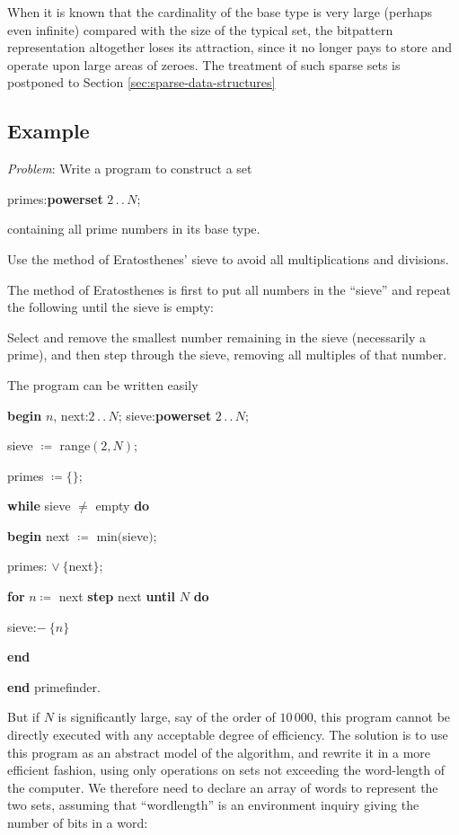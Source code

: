When it is known that the cardinality of the base type is very large (perhaps even infinite) compared with the size of the typical set, the bitpattern representation altogether loses its attraction, since it no longer pays to store and operate upon large areas of zeroes. The treatment of such sparse sets is postponed to Section \ref{sec:sparse-data-structures}

\subsection{Example}

\noindent
\textit{Problem}: Write a program to construct a set

\quad primes:\textbf{powerset} $2\,.\,.\,N$;

\noindent
containing all prime numbers in its base type.

\noindent
Use the method of Eratosthenes' sieve to avoid all multiplications and divisions.

The method of Eratosthenes is first to put all numbers in the ``sieve'' and repeat the following until the sieve is empty:

\noindent
Select and remove the smallest number remaining in the sieve (necessarily a prime), and then step through the sieve, removing all multiples of that number.

The program can be written easily

\noindent
\textbf{begin} $n$, next:$2\,.\,.\,N$; sieve:\textbf{powerset} $2\,.\,.\,N$;

\noindent
\quad sieve $\coloneq$ range$(2, N)$;

\noindent
\quad primes $\coloneq \{\}$;

\noindent
\quad \textbf{while} sieve $\neq$ empty \textbf{do}

\noindent
\quad \quad \textbf{begin} next $\coloneq$ min$($sieve$)$;

\noindent
\quad \quad \quad primes: $\vee\ \{$next$\}$;

\noindent
\quad \quad \quad \textbf{for} $n\coloneq$ next \textbf{step} next \textbf{until} $N$ \textbf{do}

\noindent
\quad \quad \quad \quad sieve:$-\ \{n\}$

\noindent
\quad \quad \textbf{end}

\noindent
\textbf{end} primefinder.

But if $N$ is significantly large, say of the order of $10\,000$, this program cannot be directly executed with any acceptable degree of efficiency. The solution is to use this program as an abstract model of the algorithm, and rewrite it in a more efficient fashion, using only operations on sets not exceeding the word-length of the computer. We therefore need to declare an array of words to represent the two sets, assuming that ``wordlength'' is an environment inquiry giving the number of bits in a word:

